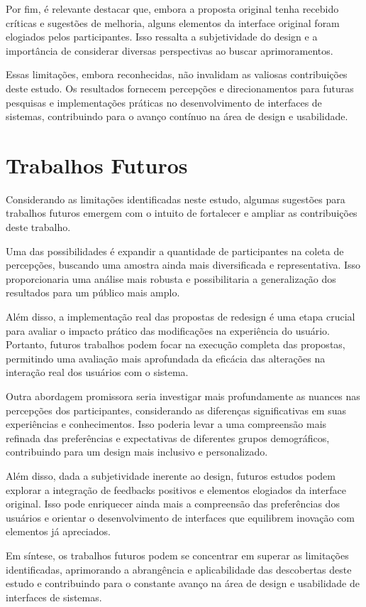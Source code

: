 Por fim, é relevante destacar que, embora a proposta original tenha recebido críticas e sugestões de melhoria, alguns elementos da interface original foram elogiados pelos participantes. Isso ressalta a subjetividade do design e a importância de considerar diversas perspectivas ao buscar aprimoramentos.

Essas limitações, embora reconhecidas, não invalidam as valiosas contribuições deste estudo. Os resultados fornecem percepções e direcionamentos para futuras pesquisas e implementações práticas no desenvolvimento de interfaces de sistemas, contribuindo para o avanço contínuo na área de design e usabilidade.

\section{Trabalhos Futuros}

Considerando as limitações identificadas neste estudo, algumas sugestões para trabalhos futuros emergem com o intuito de fortalecer e ampliar as contribuições deste trabalho.

Uma das possibilidades é expandir a quantidade de participantes na coleta de percepções, buscando uma amostra ainda mais diversificada e representativa. Isso proporcionaria uma análise mais robusta e possibilitaria a generalização dos resultados para um público mais amplo.

Além disso, a implementação real das propostas de redesign é uma etapa crucial para avaliar o impacto prático das modificações na experiência do usuário. Portanto, futuros trabalhos podem focar na execução completa das propostas, permitindo uma avaliação mais aprofundada da eficácia das alterações na interação real dos usuários com o sistema.

Outra abordagem promissora seria investigar mais profundamente as nuances nas percepções dos participantes, considerando as diferenças significativas em suas experiências e conhecimentos. Isso poderia levar a uma compreensão mais refinada das preferências e expectativas de diferentes grupos demográficos, contribuindo para um design mais inclusivo e personalizado.

Além disso, dada a subjetividade inerente ao design, futuros estudos podem explorar a integração de feedbacks positivos e elementos elogiados da interface original. Isso pode enriquecer ainda mais a compreensão das preferências dos usuários e orientar o desenvolvimento de interfaces que equilibrem inovação com elementos já apreciados.

Em síntese, os trabalhos futuros podem se concentrar em superar as limitações identificadas, aprimorando a abrangência e aplicabilidade das descobertas deste estudo e contribuindo para o constante avanço na área de design e usabilidade de interfaces de sistemas.
